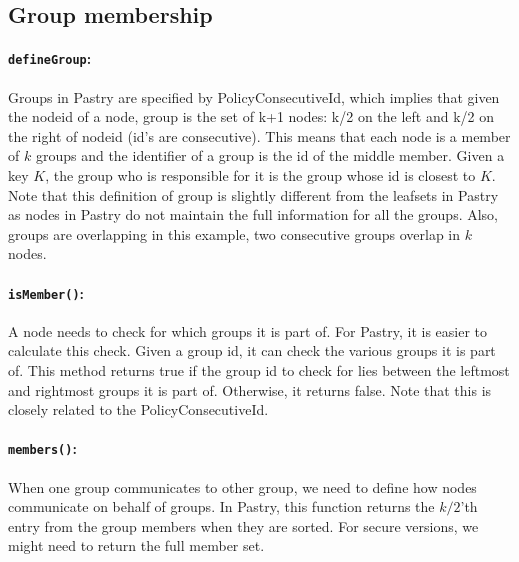 \subsection{Group membership}


\paragraph{\texttt{defineGroup}:} Groups in Pastry are specified by PolicyConsecutiveId, which implies that given the nodeid of a node, group is the set of k+1 nodes: k/2 on the left and k/2 on the right of nodeid (id's are consecutive). This means that each node is a member of $k$ groups and the identifier of a group is the id of the middle member. Given a key $K$, the group who is responsible for it is the group whose id is closest to $K$. Note that this definition of group is slightly different from the leafsets in Pastry as nodes in Pastry do not maintain the full information for all the groups. Also, groups are overlapping in this example, two consecutive groups overlap in $k$ nodes.


\paragraph{\texttt{isMember()}:} A node needs to check for which groups it is part of. For Pastry, it is easier to calculate this check. Given a group id, it can check the various groups it is part of. This method returns true if the group id to check for lies between the leftmost and rightmost groups it is part of. Otherwise, it returns false. Note that this is closely related to the PolicyConsecutiveId.

\paragraph{\texttt{members()}:} When one group communicates to other group, we need to define how nodes communicate on behalf of groups. In Pastry, this function returns the $k/2$'th entry from the group members when they are sorted. For secure versions, we might need to return the full member set.

